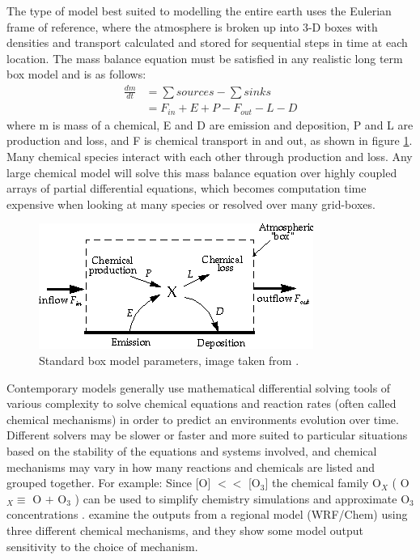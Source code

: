   
  The type of model best suited to modelling the entire earth uses the Eulerian frame of reference, where the atmosphere is broken up into 3-D boxes with densities and transport calculated and stored for sequential steps in time at each location.
  The mass balance equation must be satisfied in any realistic long term box model and is as follows: 
  \begin{align*}
    \frac{dm}{dt} & = \sum{sources}-\sum{sinks} \\
                  & = F_{in} + E + P - F_{out} - L - D 
  \end{align*}
  where m is mass of a chemical, E and D are emission and deposition, P and L are production and loss, and F is chemical transport in and out, as shown in figure \ref{LR:Models:fig_boxmodel}.
  Many chemical species interact with each other through production and loss. 
  Any large chemical model will solve this mass balance equation over highly coupled arrays of partial differential equations, which becomes computation time expensive when looking at many species or resolved over many grid-boxes.
  
  \begin{figure}
    \includegraphics{Figures/boxmodel.png}
    \caption{ %
      Standard box model parameters, image taken from \cite{Jacob_1999_book}. }
    \label{LR:Models:fig_boxmodel}
  \end{figure}
  
  
  Contemporary models generally use mathematical differential solving tools of various complexity to solve chemical equations and reaction rates (often called chemical mechanisms) in order to predict an environments evolution over time.
  Different solvers may be slower or faster and more suited to particular situations based on the stability of the equations and systems involved, and chemical mechanisms may vary in how many reactions and chemicals are listed and grouped together.
  For example: Since [O] $<<$ [O$_3$] the chemical family O$_X$ (  O$_X \equiv $ O $+$ O$_3$ ) can be used to simplify chemistry simulations and approximate O$_3$ concentrations \citep[][Chapter 3]{BrasseurJacob2017}.
  \cite{Zhang2012} examine the outputs from a regional model (WRF/Chem) using three different chemical mechanisms, and they show some model output sensitivity to the choice of mechanism.
  
